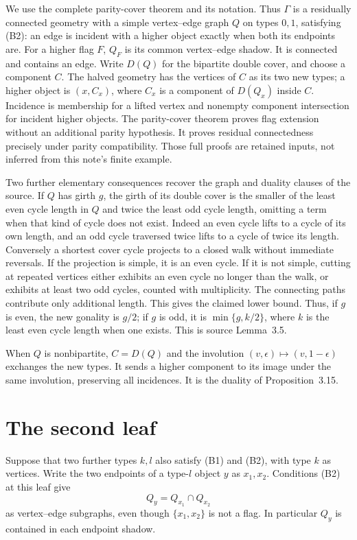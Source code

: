We use the complete parity-cover theorem and its notation. Thus $\Gamma$
is a residually connected geometry with a simple vertex--edge graph $Q$
on types $0,1$, satisfying (B2): an edge is incident with a higher object
exactly when both its endpoints are. For a higher flag $F$, $Q_F$ is
its common vertex--edge shadow. It is connected and contains an edge.
Write $D(Q)$ for the bipartite double cover, and choose a component $C$.
The halved geometry has the vertices of $C$ as its two new types;
a higher object is $(x,C_x)$, where $C_x$ is a component of $D(Q_x)$
inside $C$. Incidence is membership for a lifted vertex and nonempty
component intersection for incident higher objects. The parity-cover
theorem proves flag extension without an additional parity hypothesis.
It proves residual connectedness precisely under parity compatibility.
Those full proofs are retained inputs, not inferred from this note's
finite example.

Two further elementary consequences recover the graph and duality
clauses of the source. If $Q$ has girth $g$, the girth of its double
cover is the smaller of the least even cycle length in $Q$ and twice
the least odd cycle length, omitting a term when that kind of cycle
does not exist. Indeed an even cycle lifts to a cycle of its own
length, and an odd cycle traversed twice lifts to a cycle of twice
its length. Conversely a shortest cover cycle projects to a closed
walk without immediate reversals. If the projection is simple, it
is an even cycle. If it is not simple, cutting at repeated vertices
either exhibits an even cycle no longer than the walk, or exhibits
at least two odd cycles, counted with multiplicity. The connecting
paths contribute only additional length. This gives the claimed
lower bound. Thus, if $g$ is even, the new gonality is $g/2$; if
$g$ is odd, it is $\min\{g,k/2\}$, where $k$ is the least even
cycle length when one exists. This is source Lemma~3.5.

When $Q$ is nonbipartite, $C=D(Q)$ and the involution
$(v,\epsilon)\mapsto(v,1-\epsilon)$ exchanges the new types.
It sends a higher component to its image under the same involution,
preserving all incidences. It is the duality of Proposition~3.15.

\section{The second leaf}
Suppose that two further types $k,l$ also satisfy (B1) and (B2), with
type $k$ as vertices. Write the two endpoints of a type-$l$ object $y$
as $x_1,x_2$. Conditions (B2) at this leaf give
\[
                 Q_y=Q_{x_1}\cap Q_{x_2}
\]
as vertex--edge subgraphs, even though $\{x_1,x_2\}$ is not a flag.
In particular $Q_y$ is contained in each endpoint shadow.

